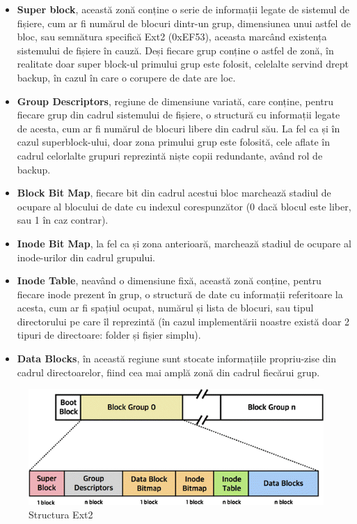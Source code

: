 \begin{itemize}
  \item \textbf{Super block}, această zonă conține o serie de informații legate de sistemul de fișiere, cum ar fi numărul de blocuri dintr-un grup, dimensiunea unui astfel de bloc, sau semnătura specifică Ext2 (0xEF53), aceasta marcând existența sistemului de fișiere în cauză. Deși fiecare grup conține o astfel de zonă, în realitate doar super block-ul primului grup este folosit, celelalte servind drept backup, în cazul în care o corupere de date are loc.

  \item \textbf{Group Descriptors}, regiune de dimensiune variată, care conține, pentru fiecare grup din cadrul sistemului de fișiere, o structură cu informații legate de acesta, cum ar fi numărul de blocuri libere din cadrul său. La fel ca și în cazul superblock-ului, doar zona primului grup este folosită, cele aflate în cadrul celorlalte grupuri reprezintă niște copii redundante, având rol de backup.

  \item \textbf{Block Bit Map}, fiecare bit din cadrul acestui bloc marchează stadiul de ocupare al blocului de date cu indexul corespunzător (0 dacă blocul este liber, sau 1 în caz contrar).

  \item \textbf{Inode Bit Map}, la fel ca și zona anterioară, marchează stadiul de ocupare al inode-urilor din cadrul grupului.

  \item \textbf{Inode Table}, neavând o dimensiune fixă, această zonă conține, pentru fiecare inode prezent în grup, o structură de date cu informații referitoare la acesta, cum ar fi spațiul ocupat, numărul și lista de blocuri, sau tipul directorului pe care îl reprezintă (în cazul implementării noastre există doar 2 tipuri de directoare: folder și fișier simplu).

  \item \textbf{Data Blocks}, în această regiune sunt stocate informațiile propriu-zise din cadrul directoarelor, fiind cea mai amplă zonă din cadrul fiecărui grup.
  
\end{itemize}

\clearpage
\begin{figure}[h!]
    \centering
    \includegraphics[width=1.0\linewidth]{images/2.6.png}
    \caption{Structura Ext2}
    \label{fig:enter-label}
\end{figure}

